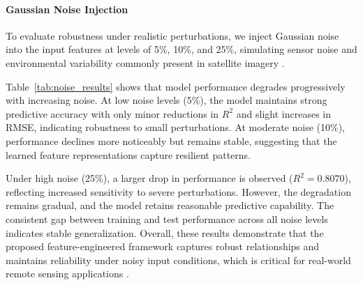 \documentclass[11pt]{article}
\begin{document}
\paragraph{Gaussian Noise Injection}
To evaluate robustness under realistic perturbations, we inject Gaussian noise into the input features at levels of 5\%, 10\%, and 25\%, simulating sensor noise and environmental variability commonly present in satellite imagery \citep{zhu2017deep}.

Table~\ref{tab:noise_results} shows that model performance degrades progressively with increasing noise. At low noise levels (5\%), the model maintains strong predictive accuracy with only minor reductions in $R^2$ and slight increases in RMSE, indicating robustness to small perturbations. At moderate noise (10\%), performance declines more noticeably but remains stable, suggesting that the learned feature representations capture resilient patterns.

\begin{table}[h] \centering {} \caption{Model performance under increasing levels of Gaussian noise with XGBoost.} \label{tab:noise_results} \end{table}

Under high noise (25\%), a larger drop in performance is observed ($R^2 = 0.8070$), reflecting increased sensitivity to severe perturbations. However, the degradation remains gradual, and the model retains reasonable predictive capability. The consistent gap between training and test performance across all noise levels indicates stable generalization.
Overall, these results demonstrate that the proposed feature-engineered framework captures robust relationships and maintains reliability under noisy input conditions, which is critical for real-world remote sensing applications \citep{hendrycks2019benchmarking}.

\end{document}
